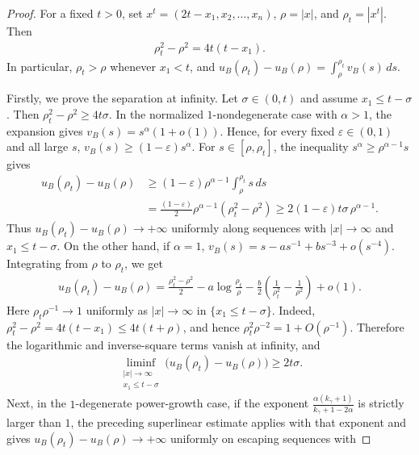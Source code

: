 \documentclass[10pt,a4paper]{amsart}
\begin{document}
	\begin{proof}
		For a fixed $t>0$, set $x^t=(2t-x_1,x_2,\ldots,x_n)$,
		$\rho=|x|$, and $\rho_t=|x^t|$.  Then
		\begin{align}
			\label{eq:reflected-radius-difference}
			\rho_t^2-\rho^2=4t(t-x_1).
		\end{align}
		In particular, $\rho_t>\rho$ whenever $x_1<t$, and
		$u_B(\rho_t)-u_B(\rho)=\int_\rho^{\rho_t}v_B(s)\,ds$.
		
		\medskip
		
	Firstly, we prove the separation at infinity.  Let $\sigma\in(0,t)$ and assume $x_1\le t-\sigma$.  Then $\rho_t^2-\rho^2\ge4t\sigma$. In the normalized $1$-nondegenerate case with $\alpha>1$, the expansion gives $v_B(s)=s^\alpha(1+o(1))$.  Hence, for every fixed $\varepsilon\in(0,1)$ and all large $s$, $v_B(s)\ge(1-\varepsilon)s^\alpha$. For $s\in[\rho,\rho_t]$, the inequality $s^\alpha\ge\rho^{\alpha-1}s$ gives
		\begin{align*}
			u_B(\rho_t)-u_B(\rho)
			&\ge
			(1-\varepsilon)\rho^{\alpha-1}\int_\rho^{\rho_t}s\,ds  \\
			&=
			\frac{(1-\varepsilon)}{2}\rho^{\alpha-1}(\rho_t^2-\rho^2)
			\ge
			2(1-\varepsilon)t\sigma\,\rho^{\alpha-1}.
		\end{align*}
		Thus $u_B(\rho_t)-u_B(\rho)\to+\infty$ uniformly along sequences with
		$|x|\to\infty$ and $x_1\le t-\sigma$. On the other hand, if  $\alpha=1$,
		$v_B(s)=s-as^{-1}+bs^{-3}+o(s^{-4})$.  Integrating from $\rho$ to
		$\rho_t$, we get
		\begin{align*}
			u_B(\rho_t)-u_B(\rho)
			=
			\frac{\rho_t^2-\rho^2}{2}
			-
			a\log\frac{\rho_t}{\rho}
			-
			\frac{b}{2}
			\left(\frac{1}{\rho_t^2}-\frac{1}{\rho^2}\right)
			+
			o(1).
		\end{align*}
		Here $\rho_t\rho^{-1}\to1$ uniformly as $|x|\to\infty$ in
		$\{x_1\le t-\sigma\}$.  Indeed,
		$\rho_t^2-\rho^2=4t(t-x_1)\le4t(t+\rho)$, and hence
		$\rho_t^2\rho^{-2}=1+O(\rho^{-1})$.  Therefore the logarithmic and
		inverse-square terms vanish at infinity, and
		\begin{align*}
			\liminf\limits_{\substack{|x|\to\infty\\ x_1\le t-\sigma}}
			\bigl(u_B(\rho_t)-u_B(\rho)\bigr)
			\ge
			2t\sigma .
		\end{align*}
		Next, in the $1$-degenerate power-growth case, if the exponent
		$\frac{\alpha(k_\gamma+1)}{k_\gamma+1-2\alpha}$ is strictly larger than $1$,
		the preceding superlinear estimate applies with that exponent and gives
		$u_B(\rho_t)-u_B(\rho)\to+\infty$ uniformly on escaping sequences with

\end{proof}
\end{document}
